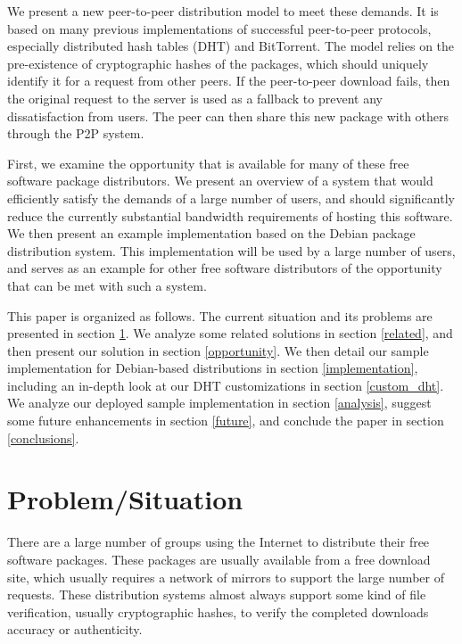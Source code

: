 \documentclass[conference]{IEEEtran}
\begin{document}
We present a new peer-to-peer distribution model to meet these
demands. It is based on many previous implementations of successful
peer-to-peer protocols, especially distributed hash tables (DHT) and
BitTorrent. The model relies on the pre-existence of cryptographic
hashes of the packages, which should uniquely identify it for a
request from other peers. If the peer-to-peer download fails, then
the original request to the server is used as a fallback to prevent
any dissatisfaction from users. The peer can then share this new
package with others through the P2P system.

First, we examine the opportunity that is available for many of
these free software package distributors. We present an overview of
a system that would efficiently satisfy the demands of a large
number of users, and should significantly reduce the currently
substantial bandwidth requirements of hosting this software. We then
present an example implementation based on the Debian package
distribution system. This implementation will be used by a large
number of users, and serves as an example for other free software
distributors of the opportunity that can be met with such a system.

This paper is organized as follows. The current situation and its
problems are presented in section \ref{situation}. We analyze some
related solutions in section \ref{related}, and then present our
solution in section \ref{opportunity}. We then detail our sample
implementation for Debian-based distributions in section
\ref{implementation}, including an in-depth look at our DHT
customizations in section \ref{custom_dht}. We analyze our deployed
sample implementation in section \ref{analysis}, suggest some future
enhancements in section \ref{future}, and conclude the paper in
section \ref{conclusions}.


\section{Problem/Situation}
\label{situation}

There are a large number of groups using the Internet to distribute
their free software packages. These packages are usually available
from a free download site, which usually requires a network of
mirrors to support the large number of requests. These distribution
systems almost always support some kind of file verification,
usually cryptographic hashes, to verify the completed downloads
accuracy or authenticity.
\end{document}
